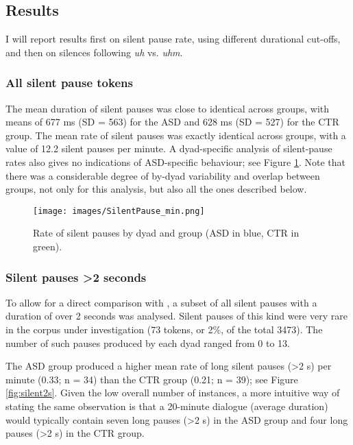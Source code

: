 \subsection{Results}\label{BCFP_FP_silent_results}

I will report results first on silent pause rate, using different durational cut-offs, and then on silences following \emph{uh} vs. \emph{uhm}.

\subsubsection{All silent pause tokens}\label{BCFP_FP_silent_results_all}

The mean duration of silent pauses was close to identical across groups, with means of 677 ms (SD = 563) for the ASD and 628 ms (SD = 527) for the CTR group. The mean rate of silent pauses was exactly identical across groups, with a value of 12.2 silent pauses per minute. A dyad-specific analysis of  silent-pause rates also gives no indications  of ASD-specific behaviour; see Figure \ref{fig:silentall}. Note that there was a considerable degree of by-dyad variability and overlap between groups, not only for this analysis, but also all the ones described below. 

\begin{figure}

\texttt{[image: images/SilentPause\_min.png]} \hfill{}

\caption{Rate of silent pauses by dyad and group (ASD in blue, CTR in green).}\label{fig:silentall}
\end{figure}



\subsubsection{\texorpdfstring{Silent pauses >2 seconds}{over 2 secs}}\label{BCFP_FP_silent_results_2s}

To allow for a direct comparison with \citet{lakeListenerVsSpeakeroriented2011}, a subset of all silent pauses with a duration of over 2 seconds was analysed. Silent pauses of this kind were very rare in the corpus under investigation (73 tokens, or 2\%, of the total 3473). The number of such pauses produced by each dyad ranged from 0 to 13.

The ASD group produced a higher mean rate of long silent pauses (>2 s) per minute (0.33; n = 34) than the CTR group (0.21; n = 39); see Figure \ref{fig:silent2s}. Given the low overall number of instances, a more intuitive way of stating the same observation is that a 20-minute dialogue (average duration) would typically contain seven long pauses (>2 s) in the ASD group and four long pauses (>2 s) in the CTR group.

